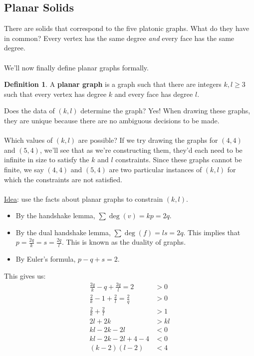 \documentclass[]{article}
\theoremstyle{definition}
\newtheorem*{defn}{Definition}
\begin{document}
		\subsection{Planar Solids}
			There are solids that correspond to the five platonic graphs. What do they have in common? Every vertex has the same degree \emph{and} every face has the same degree. 
			\\ \\
			We'll now finally define planar graphs formally.
			\begin{defn}
				A \textbf{planar graph} is a graph such that there are integers $k, l \ge 3$ such that every vertex has degree $k$ and every face has degree $l$.
			\end{defn}

			Does the data of $(k, l)$ determine the graph? Yes! When drawing these graphs, they are unique because there are no ambiguous decisions to be made.
			\\ \\
			Which values of $(k, l)$ are possible? If we try drawing the graphs for $(4,4)$ and $(5,4)$, we'll see that as we're constructing them, they'd each need to be infinite in size to satisfy the $k$ and $l$ constraints. Since these graphs cannot be finite, we say $(4,4)$ and $(5,4)$ are two particular instances of $(k, l)$ for which the constraints are not satisfied.
			\\ \\
			\underline{Idea}: use the facts about planar graphs to constrain $(k, l)$.
			
			\begin{itemize}
				\item By the handshake lemma, $\sum \deg(v) = kp = 2q$.
				\item By the dual handshake lemma, $\sum \deg(f) = ls = 2q$. This implies that $p = \frac{2q}{k} = s = \frac{2q}{l}$. This is known as the duality of graphs.
				\item By Euler's formula, $p - q + s = 2$.
			\end{itemize}

			This gives us:
			\begin{align*}
				\frac{2q}{k} - q + \frac{2q}{l} = 2 &> 0 \\
				\frac{2}{k} - 1 + \frac{2}{l} = \frac{2}{q} &> 0 \\
				\frac{2}{k} + \frac{2}{l} &> 1 \\
				2l + 2k &> kl \\
				kl - 2k - 2l &< 0 \\
				kl - 2k - 2l + 4 - 4 &< 0 \\
				(k-2)(l-2) &< 4 
			\end{align*}
\end{document}
